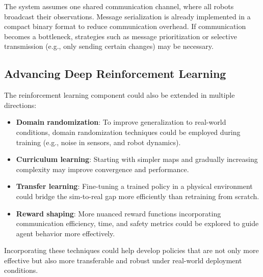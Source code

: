 The system assumes one shared communication channel, where all robots broadcast their observations. 
Message serialization is already implemented in a compact binary format to reduce communication overhead. 
If communication becomes a bottleneck, strategies such as message prioritization or selective transmission (e.g., only sending certain changes) may be necessary.


\subsection{Advancing Deep Reinforcement Learning}
The reinforcement learning component could also be extended in multiple directions:
\begin{itemize}
  \item \textbf{Domain randomization}: To improve generalization to real-world conditions, domain randomization techniques could be employed during training (e.g., noise in sensors, and robot dynamics).
  \item \textbf{Curriculum learning}: Starting with simpler maps and gradually increasing complexity may improve convergence and performance.
  \item \textbf{Transfer learning}: Fine-tuning a trained policy in a physical environment could bridge the sim-to-real gap more efficiently than retraining from scratch.
  \item \textbf{Reward shaping}: More nuanced reward functions incorporating communication efficiency, time, and safety metrics could be explored to guide agent behavior more effectively.
\end{itemize}

Incorporating these techniques could help develop policies that are not only more effective but also more transferable and robust under real-world deployment conditions.

